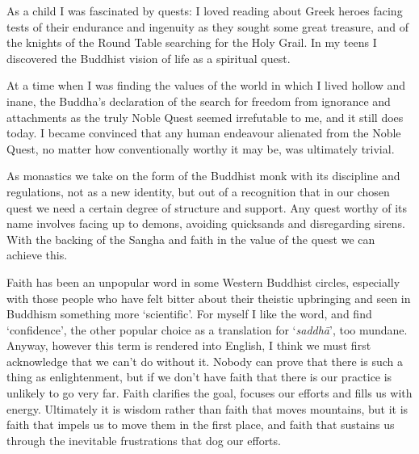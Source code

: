 
As a child I was fascinated by quests: I loved reading about Greek
heroes facing tests of their endurance and ingenuity as they sought some
great treasure, and of the knights of the Round Table searching for the
Holy Grail. In my teens I discovered the Buddhist vision of life as a
spiritual quest.

At a time when I was finding the values of the world in
which I lived hollow and inane, the Buddha's declaration of the search
for freedom from ignorance and attachments as the truly Noble Quest
seemed irrefutable to me, and it still does today. I became convinced
that any human endeavour alienated from the Noble Quest, no matter how
conventionally worthy it may be, was ultimately trivial. 

As monastics we take on the form of the Buddhist monk with its
discipline and regulations, not as a new identity, but out of a
recognition that in our chosen quest we need a certain degree of
structure and support. Any quest worthy of its name involves facing up
to demons, avoiding quicksands and disregarding sirens. With the backing
of the Sangha and faith in the value of the quest we can achieve this. 

Faith has been an unpopular word in some Western Buddhist circles, 
especially with those people who have felt bitter about their theistic
upbringing and seen in Buddhism something more `scientific'. For myself
I like the word, and find `confidence', the other popular choice as a
translation for `\emph{saddhā}', too mundane. Anyway, however this term
is rendered into English, I think we must first acknowledge that we
can't do without it. Nobody can prove that there is such a thing as
enlightenment, but if we don't have faith that there is our practice is
unlikely to go very far. Faith clarifies the goal, focuses our efforts
and fills us with energy. Ultimately it is wisdom rather than faith that
moves mountains, but it is faith that impels us to move them in the
first place, and faith that sustains us through the inevitable
frustrations that dog our efforts. 


